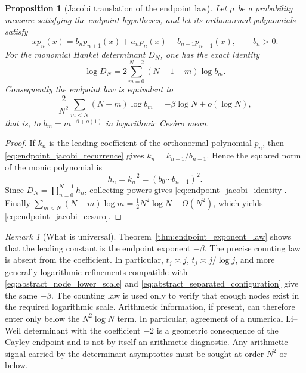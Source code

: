 \documentclass[11pt]{amsart}
\numberwithin{equation}{section}
\theoremstyle{plain}
\newtheorem{proposition}[theorem]{Proposition}
\theoremstyle{definition}
\theoremstyle{remark}
\newtheorem{remark}[theorem]{Remark}
\begin{document}
\begin{proposition}[Jacobi translation of the endpoint law]
\label{prop:endpoint_jacobi_translation}
Let \(\mu\) be a probability measure satisfying the endpoint hypotheses, and let its orthonormal
polynomials satisfy
\begin{equation}
xp_n(x)=b_np_{n+1}(x)+a_np_n(x)+b_{n-1}p_{n-1}(x),
\qquad b_n>0.
\label{eq:endpoint_jacobi_recurrence}
\end{equation}
For the monomial Hankel determinant \(D_N\), one has the exact identity
\begin{equation}
\boxed{\log D_N=2\sum_{m=0}^{N-2}(N-1-m)\log b_m.}
\label{eq:endpoint_jacobi_identity}
\end{equation}
Consequently the endpoint law is equivalent to
\begin{equation}
\frac{2}{N^2}\sum_{m<N}(N-m)\log b_m
=-\beta\log N+o(\log N),
\label{eq:endpoint_jacobi_cesaro}
\end{equation}
that is, to \(b_m=m^{-\beta+o(1)}\) in logarithmic Ces\`aro mean.
\end{proposition}

\begin{proof}
If \(k_n\) is the leading coefficient of the orthonormal polynomial \(p_n\), then
\eqref{eq:endpoint_jacobi_recurrence} gives \(k_n=k_{n-1}/b_{n-1}\).  Hence the squared norm of the
monic polynomial is
\[
h_n=k_n^{-2}=(b_0\cdots b_{n-1})^2.
\]
Since \(D_N=\prod_{n=0}^{N-1}h_n\), collecting powers gives
\eqref{eq:endpoint_jacobi_identity}.  Finally
\(\sum_{m<N}(N-m)\log m=\tfrac12N^2\log N+O(N^2)\), which yields
\eqref{eq:endpoint_jacobi_cesaro}.
\end{proof}

\begin{remark}[What is universal]
\label{rem:what_is_universal}
Theorem~\ref{thm:endpoint_exponent_law} shows that the leading constant is the endpoint exponent $-\beta$. The precise counting law is absent from the coefficient. In particular, $t_j\asymp j$, $t_j\asymp j/\log j$, and more generally logarithmic refinements compatible with \eqref{eq:abstract_node_lower_scale} and \eqref{eq:abstract_separated_configuration} give the same $-\beta$. The counting law is used only to verify that enough nodes exist in the required logarithmic scale. Arithmetic information, if present, can therefore enter only below the $N^2\log N$ term.
In particular, agreement of a numerical Li--Weil determinant with the coefficient $-2$ is a
geometric consequence of the Cayley endpoint and is not by itself an arithmetic diagnostic.  Any
arithmetic signal carried by the determinant asymptotics must be sought at order $N^2$ or below.
\end{remark}
\end{document}
